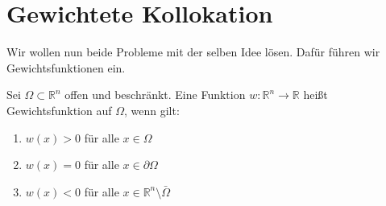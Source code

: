 \section{Gewichtete Kollokation}
Wir wollen nun beide Probleme mit der selben Idee lösen. Dafür führen wir Gewichtsfunktionen ein.
\begin{definition}
Sei $\Omega \subset \mathbb{R}^n$ offen und beschränkt. Eine Funktion $w:\mathbb{R}^n \rightarrow \mathbb{R}$ heißt Gewichtsfunktion auf $\Omega$, wenn gilt:
\begin{enumerate}
\item $w(x) > 0$ für alle $x \in \Omega$
\item $w(x) = 0$ für alle $x \in \partial \Omega$
\item $w(x) < 0$ für alle $x \in \mathbb{R}^n \setminus \bar{\Omega}$
\end{enumerate}
\end{definition}

